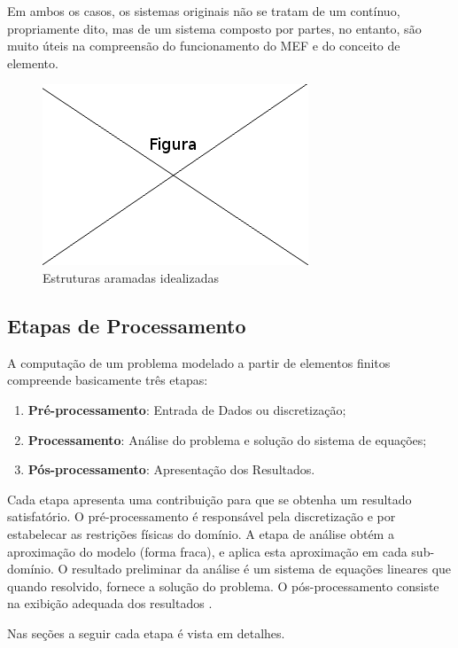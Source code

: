 Em ambos os casos, os sistemas originais não se tratam de um contínuo, propriamente dito, mas de um sistema composto por partes, no entanto, são muito úteis na compreensão do funcionamento do MEF e do conceito de elemento.


\begin{figure}[!htb]
\centering
\includegraphics[scale=0.5]{figuras/temp.png}
\caption{Estruturas aramadas idealizadas}
\label{fig:arame}
\end{figure}





\subsection{Etapas de Processamento}
A computação de um problema modelado a partir de elementos finitos compreende basicamente três etapas: 
\begin{enumerate}  
\item \textbf{Pré-processamento}: Entrada de Dados ou discretização;
\item \textbf{Processamento}: Análise do problema e  solução do sistema de equações;
\item \textbf{Pós-processamento}: Apresentação dos Resultados. 
\end{enumerate}

Cada etapa apresenta uma contribuição para que se obtenha um resultado satisfatório. O pré-processamento é responsável pela discretização e por estabelecar as restrições físicas do domínio. A etapa de análise obtém a aproximação do modelo (forma fraca), e aplica esta aproximação em cada sub-domínio. O resultado preliminar da análise é um sistema de equações lineares que quando resolvido, fornece a solução do problema.  O pós-processamento consiste na exibição adequada dos resultados \citep[p. 665, 666]{zien}.


Nas seções a seguir cada etapa é vista em detalhes.

